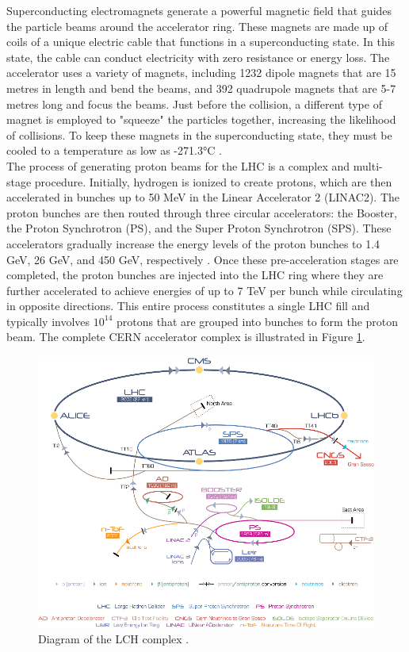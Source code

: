 Superconducting electromagnets generate a powerful magnetic field that guides the particle beams around the accelerator ring. These magnets are made up of coils of a unique electric cable that functions in a superconducting state. In this state, the cable can conduct electricity with zero resistance or energy loss. The accelerator uses a variety of magnets, including 1232 dipole magnets that are 15 metres in length and bend the beams, and 392 quadrupole magnets that are 5-7 metres long and focus the beams. Just before the collision, a different type of magnet is employed to "squeeze" the particles together, increasing the likelihood of collisions. To keep these magnets in the superconducting state, they must be cooled to a temperature as low as -271.3°C \cite{LHC}.\\

The process of generating proton beams for the LHC is a complex and multi-stage procedure. Initially, hydrogen is ionized to create protons, which are then accelerated in bunches up to 50 MeV in the Linear Accelerator 2 (LINAC2). The proton bunches are then routed through three circular accelerators: the Booster, the Proton Synchrotron (PS), and the Super Proton Synchrotron (SPS). These accelerators gradually increase the energy levels of the proton bunches to 1.4 GeV, 26 GeV, and 450 GeV, respectively \cite{lhc_complex}. Once these pre-acceleration stages are completed, the proton bunches are injected into the LHC ring where they are further accelerated to achieve energies of up to 7 TeV per bunch while circulating in opposite directions. This entire process constitutes a single LHC fill and typically involves $10^{14}$ protons that are grouped into bunches to form the proton beam. The complete CERN accelerator complex is illustrated in Figure \ref{lhc_com}.

\begin{center}
  \begin{figure}[h]
    \centering
    \includegraphics[scale=.45]{Chapter1/lhc_complex_fig.png}
    \caption[LHC Complex]{Diagram of the LCH complex \cite{lhc_complex}.}
    \label{lhc_com}
  \end{figure}
\end{center}

